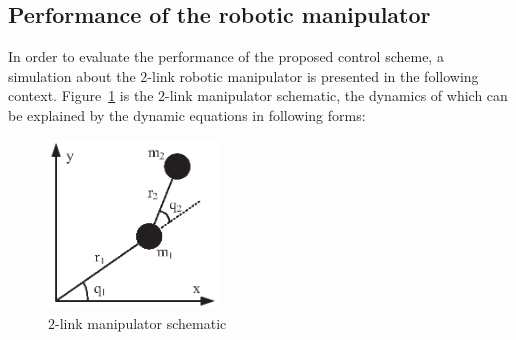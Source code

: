 \documentclass[3p]{elsarticle}
\theoremstyle{plain}
\theoremstyle{remark}
\begin{document}
\subsection{Performance of the robotic manipulator}
In order to evaluate the performance of the proposed control scheme, a simulation about the $2$-link robotic manipulator is presented in the following context. Figure~\ref{Figure:1} is the $2$-link manipulator schematic, the dynamics of which can be explained by the dynamic equations in following forms:

\begin{figure}
\centering
\includegraphics[width=0.4\textwidth]{paper3_fig1.eps}
\caption{$2$-link manipulator schematic}
\label{Figure:1}
\end{figure}
\end{document}
